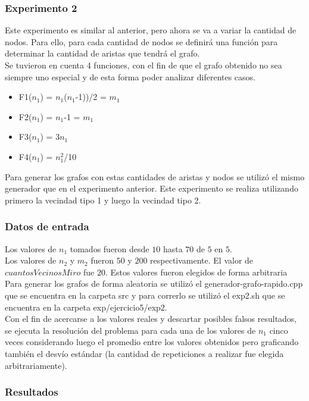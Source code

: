 \subsubsection*{Experimento 2}\;
\noindent Este experimento es similar al anterior, pero ahora se va a variar la cantidad de nodos. Para ello, para cada cantidad de nodos se definirá una función para determinar la cantidad de aristas que tendrá el grafo. \\
\noindent Se tuvieron en cuenta 4 funciones, con el fin de que el grafo obtenido no sea siempre uno especial y de esta forma poder analizar diferentes casos. 
        \begin{itemize}
        \item F1($n_1$) = $n_1$($n_1$-1))/2 = $m_1$ 
        \item F2($n_1$) = $n_1$-1 = $m_1$ 
        \item F3($n_1$) = 3$n_1$
        \item F4($n_1$) = $n_1^{2}$/10
		\end{itemize} 
Para generar los grafos con estas cantidades de aristas y nodos se utilizó el mismo generador que en el experimento anterior.
Este experimento se realiza utilizando primero la vecindad tipo 1 y luego la vecindad tipo 2.
\subsubsection*{Datos de entrada}\;
    \noindent Los valores de $n_1$ tomados fueron desde $10$ hasta $70$ de $5$ en $5$. \\
       Los valores de $n_2$ y $m_2$ fueron $50$ y $200$ respectivamente. El valor de $cuantosVecinosMiro$ fue $20$. Estos valores fueron elegidos de forma arbitraria \\
        Para generar los grafos de forma aleatoria se utilizó el generador-grafo-rapido.cpp que se encuentra en la carpeta src y para correrlo se utilizó el exp2.sh que se encuentra en la carpeta exp/ejercicio5/exp2. \\
        Con el fin de acercarse a los valores reales y descartar posibles falsos resultados, se ejecuta la resolución del problema para cada una de los valores de $n_1$ cinco veces considerando luego el promedio entre los valores obtenidos pero graficando también el desvío estándar (la cantidad de repeticiones a realizar fue elegida arbitrariamente).\; 
\subsubsection*{Resultados}\;

